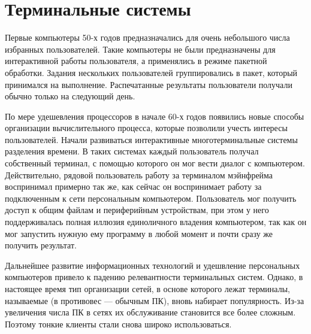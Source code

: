 \section{Терминальные системы}
Первые компьютеры 50-х годов предназначались для очень небольшого числа избранных
пользователей. Такие компьютеры не были предназначены для интерактивной работы
пользователя, а применялись в режиме пакетной обработки.  Задания нескольких
пользователей группировались в пакет, который принимался на выполнение. Распечатанные
результаты пользователи получали обычно только на следующий день.

По мере удешевления процессоров в начале 60-х годов появились новые способы организации
вычислительного процесса, которые позволили учесть интересы пользователей.  Начали
развиваться интерактивные многотерминальные системы разделения времени.  В таких
системах каждый пользователь получал собственный терминал, с помощью которого он мог
вести диалог с компьютером.
Действительно, рядовой пользователь работу за терминалом мэйнфрейма воспринимал примерно
так же, как сейчас он воспринимает работу за подключенным к сети персональным
компьютером. Пользователь мог получить доступ к общим файлам и периферийным устройствам,
при этом у него поддерживалась полная иллюзия единоличного владения компьютером, так как
он мог запустить нужную ему программу в любой момент и почти сразу же получить
результат. \cite{olifer}

Дальнейшее развитие информационных технологий и удешвление персональных компьютеров
привело к падению релевантности терминальных систем. Однако, в настоящее время тип
организации сетей, в основе которого лежат терминалы, называемые 
(в противовес  — обычным ПК), вновь набирает популярность. Из-за
увеличения числа ПК в сетях их обслуживание становится все более сложным. Поэтому тонкие
клиенты стали снова широко использоваться.
